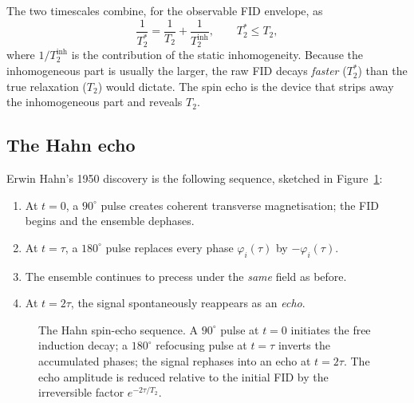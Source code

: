 \documentclass[11pt,a4paper]{article}
\theoremstyle{thmstyle}
\theoremstyle{definition}
\theoremstyle{remark}
\newcommand{\Tprep}{T_{2}^{*}}
\newcommand{\Ttwo}{T_{2}}
\begin{document}
The two timescales combine, for the observable FID envelope, as
\begin{equation}
\frac{1}{\Tprep} = \frac{1}{\Ttwo} + \frac{1}{\Ttwo^{\mathrm{inh}}},
\qquad \Tprep \le \Ttwo ,
\label{eq:t2star}
\end{equation}
where $1/\Ttwo^{\mathrm{inh}}$ is the contribution of the static
inhomogeneity. Because the inhomogeneous part is usually the larger, the
raw FID decays \emph{faster} ($\Tprep$) than the true relaxation
($\Ttwo$) would dictate. The spin echo is the device that strips away the
inhomogeneous part and reveals $\Ttwo$.

\subsection{The Hahn echo}
\label{sec:hahn}

Erwin Hahn's 1950 discovery \citep{hahn1950} is the following sequence,
sketched in Figure~\ref{fig:pulse}:

\begin{enumerate}[leftmargin=1.5em,itemsep=0.15em]
\item At $t=0$, a $90^{\circ}$ pulse creates coherent transverse
magnetisation; the FID begins and the ensemble dephases.
\item At $t=\tau$, a $180^{\circ}$ pulse replaces every phase
$\varphi_{i}(\tau)$ by $-\varphi_{i}(\tau)$.
\item The ensemble continues to precess under the \emph{same} field as
before.
\item At $t=2\tau$, the signal spontaneously reappears as an
\emph{echo}.
\end{enumerate}

\begin{figure}[t]
\centering
{}
\caption{The Hahn spin-echo sequence. A $90^{\circ}$ pulse at $t=0$
initiates the free induction decay; a $180^{\circ}$ refocusing pulse at
$t=\tau$ inverts the accumulated phases; the signal rephases into an echo
at $t=2\tau$. The echo amplitude is reduced relative to the initial FID
by the irreversible factor $e^{-2\tau/\Ttwo}$.}
\label{fig:pulse}
\end{figure}
\end{document}

